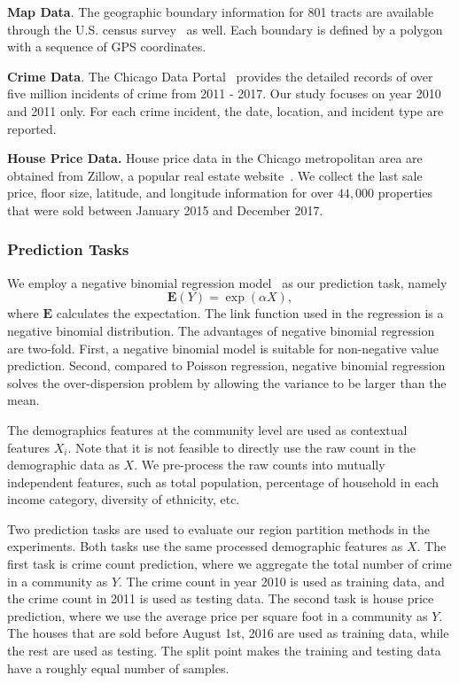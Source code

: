 \textbf{Map Data}. The geographic boundary information for 801 tracts are available through the U.S. census survey~\cite{census:2010} as well. Each boundary is defined by a polygon with a sequence of GPS coordinates.

\textbf{Crime Data}. The Chicago Data Portal~\cite{data-crime} provides the detailed records of over five million incidents of crime from 2011 - 2017. Our study focuses on year 2010 and 2011 only. For each crime incident, the date, location, and incident type are reported. 

\textbf{House Price Data.} House price data in the Chicago metropolitan area are obtained from Zillow, a popular real estate website~\cite{data-houseprice}. We collect the last sale price, floor size, latitude,  and longitude information for over $44,000$ properties that were sold between January 2015 and December 2017.


\subsubsection{Prediction Tasks}


We employ a negative binomial regression model~\cite{wang2016crime} as our prediction task, namely
\begin{equation*}
\mathbf{E}(Y) = \exp( \alpha X ),
\end{equation*}
where $\mathbf{E}$ calculates the expectation. The link function used in the regression is a negative binomial distribution. The advantages of negative binomial regression are two-fold. First, a negative binomial model is suitable for non-negative value prediction. Second, compared to Poisson regression, negative binomial regression solves the over-dispersion problem by allowing the variance to be larger than the mean.

The demographics features at the community level are used as contextual features $X_i$. Note that it is not feasible to directly use the raw count in the demographic data as $X$. We pre-process the raw counts into mutually independent features, such as total population, percentage of household in each income category, diversity of ethnicity, etc.


Two prediction tasks are used to evaluate our region partition methods in the experiments. Both tasks use the same processed demographic features as $X$. The first task is crime count prediction, where we aggregate the total number of crime in a community as $Y$. The crime count in year 2010 is used as training data, and the crime count in 2011 is used as testing data. The second task is house price prediction, where we use the average price per square foot in a community as $Y$. The houses that are sold before August 1st, 2016 are used as training data, while the rest are used as testing. The split point makes the training and testing data have a roughly equal number of samples.




